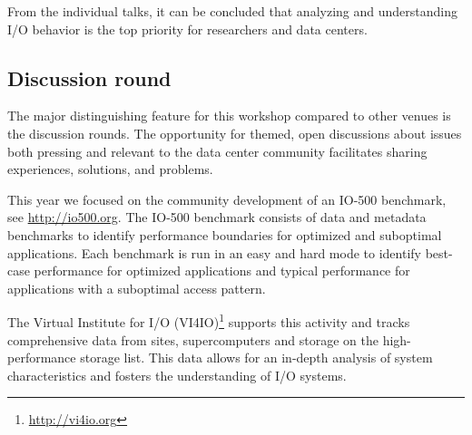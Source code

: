 \documentclass{llncs}
\begin{document}
From the individual talks, it can be concluded that analyzing and understanding I/O behavior is the top priority for researchers and data centers.


\subsection{Discussion round}

The major distinguishing feature for this workshop compared to other venues is the discussion rounds.
The opportunity for themed, open discussions about issues both pressing and relevant to the data center
community facilitates sharing experiences, solutions, and problems.

This year we focused on the community development of an IO-500 benchmark, see \url{http://io500.org}.
The IO-500 benchmark consists of data and metadata benchmarks to identify performance boundaries for optimized and suboptimal applications.
Each benchmark is run in an easy and hard mode to identify best-case performance for optimized applications and typical performance for applications with a suboptimal access pattern.

The Virtual Institute for I/O (VI4IO)\footnote{\url{http://vi4io.org}} supports this activity and tracks comprehensive data from sites, supercomputers and storage on the high-performance storage list.
This data allows for an in-depth analysis of system characteristics and fosters the understanding of I/O systems.



\end{document}
